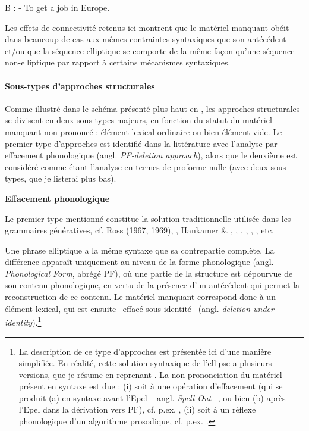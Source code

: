     B : - To get a job in Europe.  

Les effets de connectivité retenus ici montrent que le matériel manquant obéit dans beaucoup de cas aux mêmes contraintes syntaxiques que son antécédent et/ou que la séquence elliptique se comporte de la même façon qu'une séquence non-elliptique par rapport à certains mécanismes syntaxiques. 

\paragraph[Sous-types d'approches structurales]{Sous-types d'approches structurales}
Comme illustré dans le schéma présenté plus haut en , les approches structurales se divisent en deux sous-types majeurs, en fonction du statut du matériel manquant non-prononcé : élément lexical ordinaire ou bien élément vide. Le premier type d'approches est identifié dans la littérature avec l'analyse par effacement phonologique (angl. \textit{PF-deletion approach}), alors que le deuxième est considéré comme étant l'analyse en termes de proforme nulle (avec deux sous-types, que je listerai plus bas).

{\bfseries
Effacement phonologique}

Le premier type mentionné constitue la solution traditionnelle utilisée dans les grammaires génératives, cf. Ross (1967, 1969), \citet{Sag1976}, Hankamer \& \citet{Sag1976}, \citet{Hankamer1979}, \citet{Lasnik1999}, \citet{Hartmann2000}, \citet{Merchant2001}, \citet{Chung2005}, etc.

Une phrase elliptique a la même syntaxe que sa contrepartie complète. La différence apparaît uniquement au niveau de la forme phonologique (angl. \textit{Phonological Form}, abrégé PF), où une partie de la structure est dépourvue de son contenu phonologique, en vertu de la présence d'un antécédent qui permet la reconstruction de ce contenu. Le matériel manquant correspond donc à un élément lexical, qui est ensuite {\guillemotleft}~effacé sous identité~{\guillemotright} (angl. \textit{deletion under identity}).\footnote{La description de ce type d'approches est présentée ici d'une manière simplifiée. En réalité, cette solution syntaxique de l'ellipse a plusieurs versions, que je résume en reprenant \citet{Merchant2009}. La non-prononciation du matériel présent en syntaxe est due : (i) soit à une opération d'effacement (qui se produit (a) en syntaxe avant l'Epel -- angl. \textit{Spell-Out} --, ou bien (b) après l'Epel dans la dérivation vers PF), cf. p.ex. \citet{Sag1976}, (ii) soit à un réflexe phonologique d'un algorithme prosodique, cf. p.ex. \citet{Merchant2001}.}  

